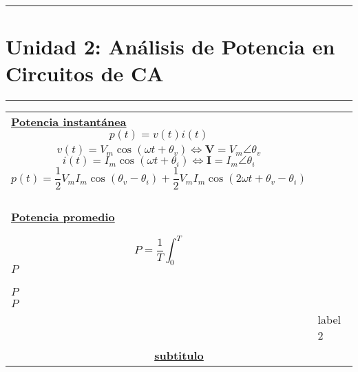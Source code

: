 \documentclass[../main.tex]{subfiles}
\begin{document}
\vspace{0.4in}
\hrule
\section{Unidad 2: Análisis de Potencia en Circuitos de CA}
\hrule
\vspace{0.1in}
\begin{tabularx}{\textwidth}{|X|X|}
\hline
\hline
  \underline{\textbf{Potencia instantánea}} 
  $$p(t)=v(t)i(t)$$\\
  $$v(t)=V_m\cos(\omega t +\theta_v) \Leftrightarrow \mathbf{V} =V_m\angle \theta_v$$
  $$i(t)=I_m\cos(\omega t +\theta_i) \Leftrightarrow \mathbf{I} =I_m\angle \theta_i$$
  $$p(t) = \frac{1}{2}V_mI_m\cos(\theta_v-\theta_i) +\frac{1}{2}V_mI_m\cos(2\omega t +\theta_v-\theta_i)$$
  \\\\
  \underline{\textbf{Potencia promedio}}

  $$P = \frac{1}{T}\int_0^T$$
  $P$\\
  $P$\\
  $P$\\
  & 
  label 2 
  \\

  \hline
  \multicolumn{2}{|c|}{\underline{\textbf{subtitulo}}} \\
  \hline
\end{tabularx}
\end{document}
